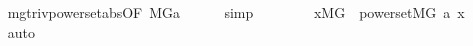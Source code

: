 \begin{isabellebody}
\ \ \ \ \isamarkupfalse%
\ mgtriv{\isachardot}{\kern0pt}powerset{\isacharunderscore}{\kern0pt}abs{\isacharbrackleft}{\kern0pt}OF\ {\isacartoucheopen}{\isacharparenleft}{\kern0pt}{\isacharhash}{\kern0pt}{\isacharhash}{\kern0pt}M{\isacharbrackleft}{\kern0pt}G{\isacharbrackright}{\kern0pt}{\isacharparenright}{\kern0pt}{\isacharparenleft}{\kern0pt}a{\isacharparenright}{\kern0pt}{\isacartoucheclose}{\isacharbrackright}{\kern0pt}\isanewline
\ \ \ \ \isamarkupfalse%
\ simp\isanewline
\ \ \isamarkupfalse%
\ \isanewline
\ \ \isamarkupfalse%
\ {\isachardoublequoteopen}{\isasymexists}x{\isasymin}M{\isacharbrackleft}{\kern0pt}G{\isacharbrackright}{\kern0pt}\ {\isachardot}{\kern0pt}\ powerset{\isacharparenleft}{\kern0pt}{\isacharhash}{\kern0pt}{\isacharhash}{\kern0pt}M{\isacharbrackleft}{\kern0pt}G{\isacharbrackright}{\kern0pt}{\isacharcomma}{\kern0pt}\ a{\isacharcomma}{\kern0pt}\ x{\isacharparenright}{\kern0pt}{\isachardoublequoteclose}\isanewline
\ \ \ \ \isamarkupfalse%
\ auto\isanewline
{}\isamarkupfalse%
%
\endisatagproof
{\isafoldproof}%
%
\isadelimproof
\isanewline
%
\endisadelimproof
{}\isamarkupfalse%
\ \isanewline
%
\isadelimtheory
%
\endisadelimtheory
%
\isatagtheory
{}\isamarkupfalse%
%
\endisatagtheory
{\isafoldtheory}%
%
\isadelimtheory
%
\endisadelimtheory
%
\end{isabellebody}%
\endinput
